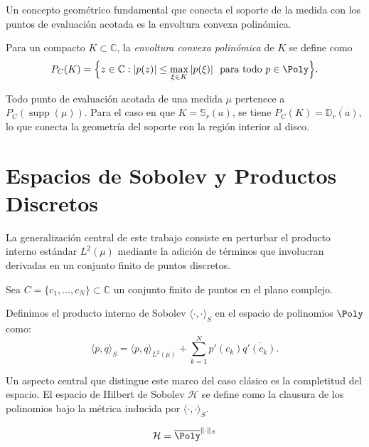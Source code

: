 Un concepto geométrico fundamental que conecta el soporte de la medida con los puntos de evaluación acotada es la envoltura convexa polinómica.

\begin{defn}\label{def:envoltura_polinomica}
	Para un compacto $K \subset \mathbb{C}$, la \emph{envoltura convexa polinómica} de $K$ se define como
	\[
		P_C(K) = \Bigl\{ z \in \mathbb{C} : |p(z)| \leq \max_{\xi \in K} |p(\xi)|\ \text{ para todo } p \in \Poly \Bigr\}.
	\]
\end{defn}

Todo punto de evaluación acotada de una medida $\mu$ pertenece a $P_C(\operatorname{supp}(\mu))$. Para el caso en que $K = \mathbb{S}_r(a)$, se tiene $P_C(K) = \overline{\mathbb{D}_r(a)}$, lo que conecta la geometría del soporte con la región interior al disco.

\section{Espacios de Sobolev y Productos Discretos}

La generalización central de este trabajo consiste en perturbar el producto interno estándar $L^2(\mu)$ mediante la adición de términos que involucran derivadas en un conjunto finito de puntos discretos.

Sea $C = \{c_1, \dots, c_N\} \subset \mathbb{C}$ un conjunto finito de puntos en el plano complejo.

\begin{defn}
	Definimos el producto interno de Sobolev $\langle \cdot, \cdot \rangle_S$ en el espacio de polinomios $\Poly$ como:
	\begin{equation} \label{eq:sobolev_inner_prod}
		\langle p, q \rangle_S = \langle p, q \rangle_{L^2(\mu)} + \sum_{k=1}^N p'(c_k) \overline{q'(c_k)}.
	\end{equation}
\end{defn}

Un aspecto central que distingue este marco del caso clásico es la completitud del espacio. El espacio de Hilbert de Sobolev $\mathcal{H}$ se define como la clausura de los polinomios bajo la métrica inducida por $\langle \cdot, \cdot \rangle_S$.

\begin{defn}
	\begin{equation}
		\mathcal{H} = \overline{\Poly}^{\|\cdot\|_S}
	\end{equation}
\end{defn}

